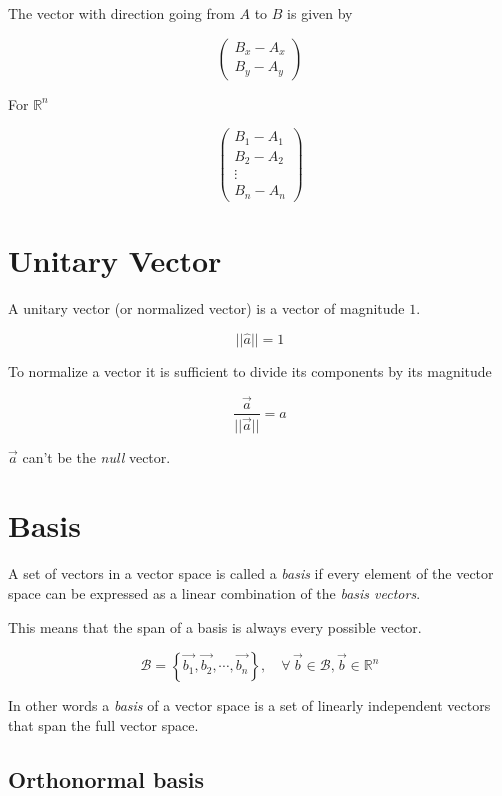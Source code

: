 \documentclass[a4paper]{article}
\begin{document}
The vector with direction going from \(A\) to \(B\) is given by

\[
    \begin{pmatrix}
        B_x - A_x \\
        B_y - A_y
    \end{pmatrix}
\]

For \({{\mathbb{R}}^n}\)

\[
    \begin{pmatrix}
        B_1 - A_1 \\
        B_2 - A_2 \\
        \vdots \\
        B_n - A_n
    \end{pmatrix}
\]

\section{Unitary Vector}

A unitary vector (or normalized vector) is a vector of magnitude \(1\).

\[
    ||\hat{a}|| = 1
\]

To normalize a vector it is sufficient to divide its components by its magnitude

\[
    \frac{\vec{a}}{||\vec{a}||}=\hat{a}
\]

\(\vec{a}\) can't be the \textit{null} vector.

\section{Basis}

A set of vectors in a vector space is called a \textit{basis} if every element
of the vector space can be expressed as a linear combination of the \textit{basis vectors}.

This means that the span of a basis is always every possible vector.

\[
    \mathcal{B} =
    \left\{
        \vec{b_1}, 
        \vec{b_2}, 
        \cdots,
        \vec{b_n}
    \right\},
    \quad \forall\, \vec{b} \in \mathcal{B}, \vec{b} \in {\mathbb{R}}^n
\]

In other words a \textit{basis} of a vector space is a set of
linearly independent vectors that span the full vector space.

\subsection{Orthonormal basis}
\end{document}

